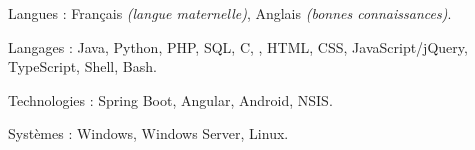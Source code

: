 \begin{indentsection}{\parindent}
  \begin{description*}
    \item[Langues :]
    Français \emph{(langue maternelle)}, %
    Anglais \emph{(bonnes connaissances)}.
    \item[Langages :] Java, Python, PHP, SQL, C, \Csharp, HTML,
    CSS, JavaScript/jQuery, TypeScript, Shell, Bash.
    \item[Technologies :] Spring Boot, Angular, Android, NSIS.
    \item[Systèmes :] Windows, Windows Server, Linux.
  \end{description*}
\end{indentsection}
